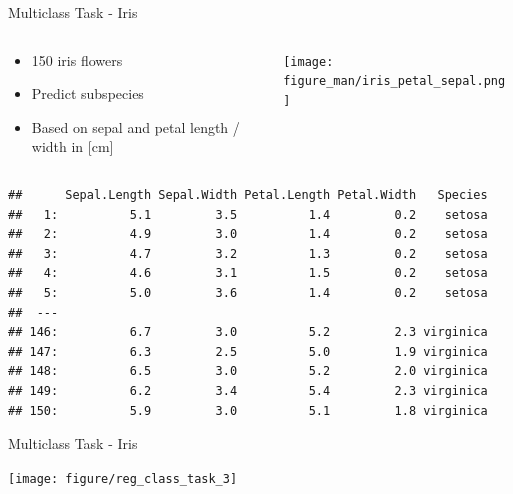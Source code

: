 \documentclass[11pt,compress,t,notes=noshow, xcolor=table]{beamer}
\begin{document}
\begin{vbframe}{Multiclass Task - Iris}

\begin{columns}[T]
\begin{column}{0.5\textwidth}
\begin{itemize}
\item 150 iris flowers
\item Predict subspecies
\item Based on sepal and petal length / width in [cm]
\end{itemize}
\end{column}
\begin{column}{0.5\textwidth}
\texttt{[image: figure\_man/iris\_petal\_sepal.png]}
\end{column}
\end{columns}
{\scriptsize
\begin{verbatim}
##      Sepal.Length Sepal.Width Petal.Length Petal.Width   Species
##   1:          5.1         3.5          1.4         0.2    setosa
##   2:          4.9         3.0          1.4         0.2    setosa
##   3:          4.7         3.2          1.3         0.2    setosa
##   4:          4.6         3.1          1.5         0.2    setosa
##   5:          5.0         3.6          1.4         0.2    setosa
##  ---
## 146:          6.7         3.0          5.2         2.3 virginica
## 147:          6.3         2.5          5.0         1.9 virginica
## 148:          6.5         3.0          5.2         2.0 virginica
## 149:          6.2         3.4          5.4         2.3 virginica
## 150:          5.9         3.0          5.1         1.8 virginica
\end{verbatim}
}
\end{vbframe}

\begin{vbframe}{Multiclass Task - Iris}
\begin{knitrout}\scriptsize
{}\color{fgcolor}

{\centering \texttt{[image: figure/reg\_class\_task\_3]}

}

\end{knitrout}
\end{vbframe}


\endlecture
\end{document}
